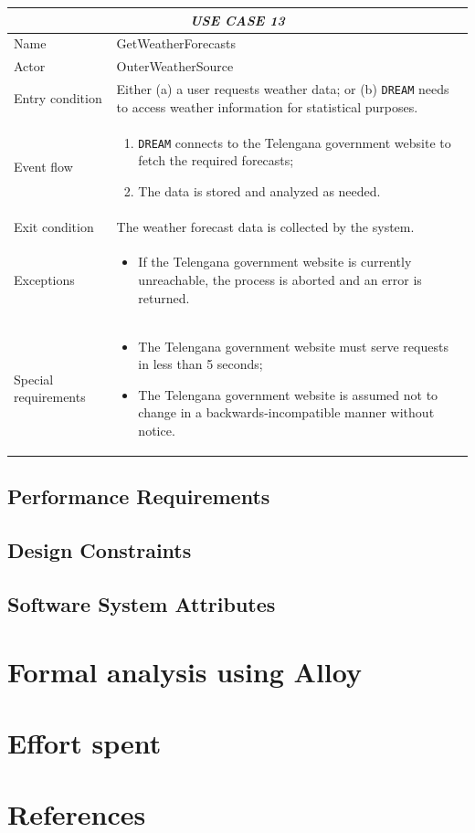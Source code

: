 \documentclass{article}
\begin{document}
\centering
\begin{longtable}{|p{3.5cm}|m{8cm}|}
 \hline
 \multicolumn{2}{|c|}{\cellcolor{white}\emph{USE CASE 13}} \\
 \endfirsthead
 \endhead
 \endfoot
 \endlastfoot
 \hline
 Name & GetWeatherForecasts\\
 \hline
 Actor & OuterWeatherSource\\
 \hline
 Entry condition & Either (a) a user requests weather data; or (b) \verb|DREAM| needs to access weather information for statistical purposes.\\
 \hline
 Event flow & \begin{enumerate}
    \item \verb|DREAM| connects to the Telengana government website to fetch the required forecasts;
    \item The data is stored and analyzed as needed.
 \end{enumerate}\\
 \hline
 Exit condition & The weather forecast data is collected by the system.\\
 \hline
 Exceptions & \begin{itemize}
     \item If the Telengana government website is currently unreachable, the process is aborted and an error is returned.
 \end{itemize}\\
 \hline
 Special requirements &\begin{itemize}
     \item The Telengana government website must serve requests in less than 5 seconds;
     \item The Telengana government website is assumed not to change in a backwards-incompatible manner without notice.
 \end{itemize}\\
 \hline
\end{longtable}
\newpage
\raggedright
\subsection{Performance Requirements}
\subsection{Design Constraints}
\subsection{Software System Attributes}
\section{Formal analysis using Alloy}
\section{Effort spent}
\section{References}
\end{document}
